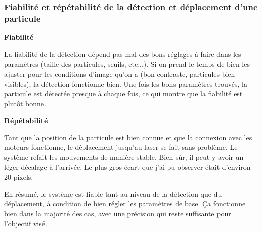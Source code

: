 \subsubsection{Fiabilité et répétabilité de la détection et déplacement d'une particule}
\textbf{Fiabilité}

La fiabilité de la détection dépend pas mal des bons réglages à faire dans les paramètres (taille des particules, seuils, etc...). Si on prend le temps de bien les ajuster pour les conditions d'image qu'on a (bon contraste, particules bien visibles), la détection fonctionne bien. Une fois les bons paramètres trouvés, la particule est détectée presque à chaque fois, ce qui montre que la fiabilité est plutôt bonne.

\textbf{Répétabilité}

Tant que la position de la particule est bien connue et que la connexion avec les moteurs fonctionne, le déplacement jusqu'au laser se fait sans problème. Le système refait les mouvements de manière stable. Bien sûr, il peut y avoir un léger décalage à l'arrivée. Le plus gros écart que j'ai pu observer était d'environ 20 pixels.

En résumé, le système est fiable tant au niveau de la détection que du déplacement, à condition de bien régler les paramètres de base. Ça fonctionne bien dans la majorité des cas, avec une précision qui reste suffisante pour l'objectif visé.